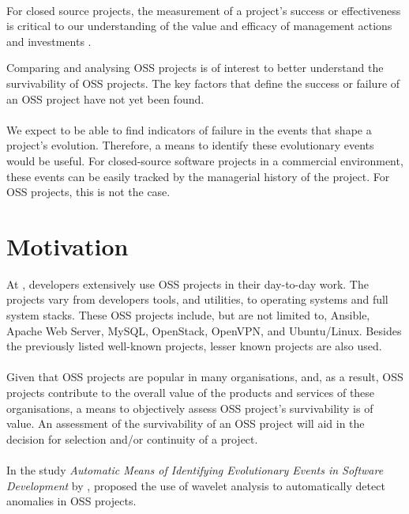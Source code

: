 \paragraph{}
For closed source projects, the measurement of a project's success or
effectiveness is critical to our understanding of the value and efficacy of
management actions and investments \cite{delone2003}.

Comparing and analysing OSS projects is of interest to better understand the
survivability of OSS projects. The key factors that define the success or
failure of an OSS project have not yet been found.

\paragraph{}
We expect to be able to find indicators of failure in the events that
shape a project's evolution. Therefore, a means to identify these evolutionary
events would be useful. For closed-source software projects in a commercial
environment, these events can be easily tracked by the managerial history of
the project. For OSS projects, this is not the case.



\section{Motivation}
At \hostOrg, developers extensively use OSS projects in their day-to-day
work. The projects vary from developers tools, and utilities, to operating
systems and full system stacks. These OSS projects include, but are not limited
to, Ansible, Apache Web Server, MySQL, OpenStack, OpenVPN, and Ubuntu/Linux.
Besides the previously listed well-known projects, lesser known projects are
also used.

\paragraph{}
Given that OSS projects are popular in many organisations, and, as a result,
OSS projects contribute to the overall value of the products and services of
these organisations, a means to objectively assess OSS project's survivability
is of value. An assessment of the survivability of an OSS project will aid in
the decision for selection and/or continuity of a project.

\paragraph{}
In the study \emph{Automatic Means of Identifying Evolutionary Events in
Software Development }\rm by \citet{karus2013}, \citeauthor{karus2013} proposed
the use of wavelet analysis to automatically detect anomalies in OSS projects.

